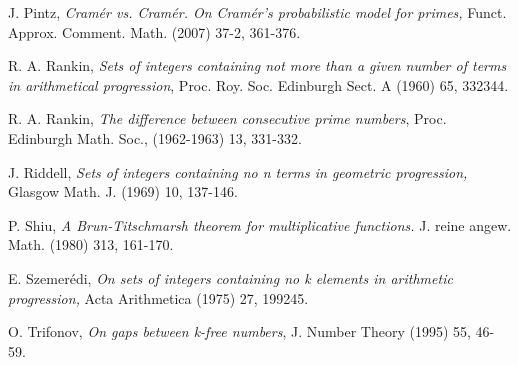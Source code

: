 \documentclass[12pt,english,BCOR7.5mm]{amsart}
\numberwithin{equation}{section}
\numberwithin{figure}{section}
\theoremstyle{definition}
\theoremstyle{plain}
\theoremstyle{plain}
\theoremstyle{plain}
\theoremstyle{definition}
\theoremstyle{plain}
\theoremstyle{plain}
\begin{document}
\begin{thebibliography}{10}
J. Pintz, \emph{Cramér vs. Cramér. On Cramér's probabilistic
model for primes, }Funct. Approx. Comment. Math. (2007) 37-2, 361-376.

R. A. Rankin, \emph{Sets of integers containing
not more than a given number of terms in arithmetical progression},
Proc. Roy. Soc. Edinburgh Sect. A (1960) 65, 332\textendash{}344.

R. A. Rankin, \emph{The difference between consecutive
prime numbers}, Proc. Edinburgh Math. Soc., (1962-1963) 13, 331-332.

J. Riddell, \emph{Sets of integers containing
no n terms in geometric progression,} Glasgow Math. J. (1969) 10,
137-146.

P. Shiu, \emph{A Brun-Titschmarsh theorem for multiplicative
functions. }J. reine angew. Math.\emph{ }(1980) 313, 161-170.

E. Szemerédi, \emph{On sets of integers containing
no k elements in arithmetic progression, }Acta Arithmetica (1975)
27, 199\textendash{}245.

O. Trifonov, \emph{On gaps between k-free numbers},
J. Number Theory (1995) 55, 46-59.\end{thebibliography}
\end{document}
